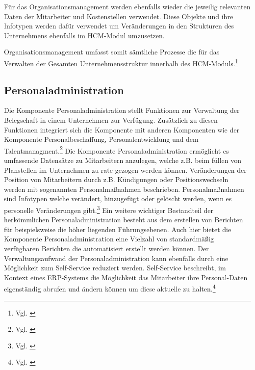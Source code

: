 Für das Organisationsmanagement werden ebenfalls wieder die jeweilig relevanten Daten der Mitarbeiter und Kostenstellen verwendet. Diese Objekte und ihre Infotypen werden dafür verwendet um Veränderungen in den Strukturen des Unternehmens ebenfalls im HCM-Modul umzusetzen. 

Organisationsmanagement umfasst somit sämtliche Prozesse die für das Verwalten der Gesamten Unternehmensstruktur innerhalb des HCM-Moduls.\footnote{Vgl. \cite{SAPSE2024a}}

\subsection{Personaladministration}
Die Komponente Personaladministration stellt Funktionen zur Verwaltung der Belegschaft in einem Unternehmen zur Verfügung. Zusätzlich zu diesen Funktionen integriert sich die Komponente mit anderen Komponenten wie der Komponente Personalbeschaffung, Personalentwicklung und dem Talentmanagment.\footnote{Vgl. \cite{SAPSE2022}} 
Die Komponente Personaladministration ermöglicht es umfassende Datensätze zu Mitarbeitern anzulegen, welche z.B. beim füllen von Planstellen im Unternehmen zu rate gezogen werden können. Veränderungen 
der Position von Mitarbeitern durch z.B. Kündigungen oder Positionswechseln werden mit sogenannten Personalmaßnahmen beschrieben. Personalmaßnahmen sind Infotypen welche verändert, hinzugefügt oder gelöscht werden, wenn es personelle Veränderungen gibt.\footnote{Vgl. \cite{SAPSE2023a}} 
Ein weitere wichtiger Bestandteil der herkömmlichen Personaladministration besteht aus dem erstellen von Berichten für beispielsweise die höher liegenden Führungsebenen. Auch hier bietet die Komponente Personaladministration eine Vielzahl von standardmäßig verfügbaren Berichten die automatisiert erstellt werden können. 
Der Verwaltungsaufwand der Personaladministration kann ebenfalls durch eine Möglichkeit zum Self-Service reduziert werden. Self-Service beschreibt, im Kontext eines ERP-Systems die Möglichkeit das Mitarbeiter ihre Personal-Daten eigenständig abrufen und ändern können um diese aktuelle zu halten.\footnote{Vgl. \cite{SAPSE2023}} 

